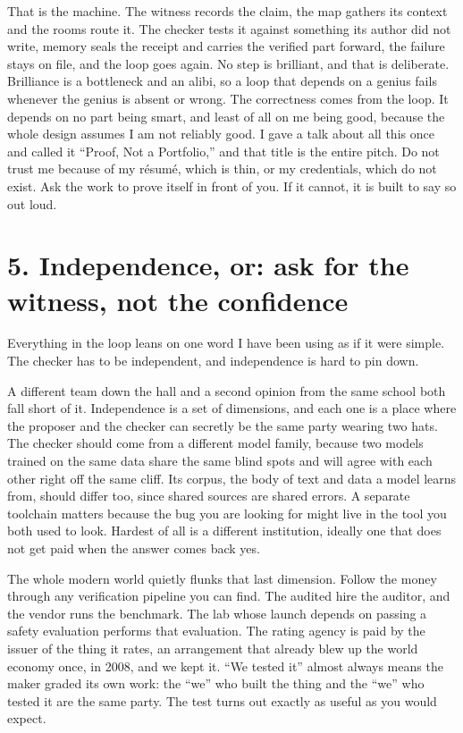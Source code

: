 \documentclass[11pt]{article}
\begin{document}
That is the machine. The witness records the claim, the map gathers its context and the rooms route it. The checker tests it against something its author did not write, memory seals the receipt and carries the verified part forward, the failure stays on file, and the loop goes again. No step is brilliant, and that is deliberate. Brilliance is a bottleneck and an alibi, so a loop that depends on a genius fails whenever the genius is absent or wrong. The correctness comes from the loop. It depends on no part being smart, and least of all on me being good, because the whole design assumes I am not reliably good. I gave a talk about all this once and called it ``Proof, Not a Portfolio,'' and that title is the entire pitch. Do not trust me because of my résumé, which is thin, or my credentials, which do not exist. Ask the work to prove itself in front of you. If it cannot, it is built to say so out loud.

\section*{5. Independence, or: ask for the witness, not the confidence}

Everything in the loop leans on one word I have been using as if it were simple. The checker has to be independent, and independence is hard to pin down.

A different team down the hall and a second opinion from the same school both fall short of it. Independence is a set of dimensions, and each one is a place where the proposer and the checker can secretly be the same party wearing two hats. The checker should come from a different model family, because two models trained on the same data share the same blind spots and will agree with each other right off the same cliff. Its corpus, the body of text and data a model learns from, should differ too, since shared sources are shared errors. A separate toolchain matters because the bug you are looking for might live in the tool you both used to look. Hardest of all is a different institution, ideally one that does not get paid when the answer comes back yes.

The whole modern world quietly flunks that last dimension. Follow the money through any verification pipeline you can find. The audited hire the auditor, and the vendor runs the benchmark. The lab whose launch depends on passing a safety evaluation performs that evaluation. The rating agency is paid by the issuer of the thing it rates, an arrangement that already blew up the world economy once, in 2008, and we kept it. ``We tested it'' almost always means the maker graded its own work: the ``we'' who built the thing and the ``we'' who tested it are the same party. The test turns out exactly as useful as you would expect.
\end{document}
